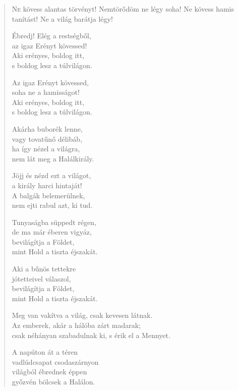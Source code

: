 
\begin{verse}

{\par%
\lettrine{N}{e} {\LettrineTextFont kövess alantas törvényt!}\newline
Nemtörődöm ne légy soha!\newline
Ne kövess hamis tanítást!\verselinebreak
Ne a világ barátja légy!
\par}

 Ébredj! Elég a restségből,\\
az igaz Erényt kövessed!\\
Aki erényes, boldog itt,\\
s boldog lesz a túlvilágon.

 Az igaz Erényt kövessed,\\
soha ne a hamisságot!\\
Aki erényes, boldog itt,\\
s boldog lesz a túlvilágon.

 Akárha buborék lenne,\\
vagy tovatűnő délibáb,\\
ha így nézel a világra,\\
nem lát meg a Halálkirály.

 Jöjj és nézd ezt a világot,\\
a király harci hintaját!\\
A balgák belemerülnek,\\
nem ejti rabul azt, ki tud.

 Tunyaságba süppedt régen,\\
de ma már éberen vigyáz,\\
bevilágítja a Földet,\\
mint Hold a tiszta éjszakát.

 Aki a bűnös tettekre\\
jótetteivel válaszol,\\
bevilágítja a Földet,\\
mint Hold a tiszta éjszakát.

 Meg van vakítva a világ, csak kevesen látnak.\\
Az emberek, akár a hálóba zárt madarak;\\
csak néhányan szabadulnak ki, s érik el a Mennyet.

 A napúton át a téren\\
vadlúdcsapat csodaszárnyon\\
világból ébrednek éppen\\
győzvén bölcsek a Halálon.


\end{verse}
